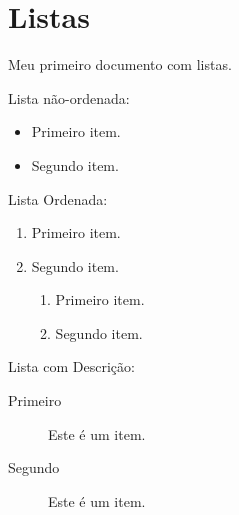 \documentclass{article}
\begin{document}
	\section{Listas}
	Meu primeiro documento com listas.
	
	Lista não-ordenada:
	
	\begin{itemize}
		\item Primeiro item.
		\item Segundo item.
	\end{itemize} 

	Lista Ordenada:
	\begin{enumerate}
		\item Primeiro item.
		\item Segundo item.
			\begin{enumerate}
				\item Primeiro item.
				\item Segundo item.
			\end{enumerate}
	\end{enumerate}

	Lista com Descrição:
	\begin{description}
		\item[Primeiro] Este é um item.
		\item[Segundo] Este é um item.
	\end{description}
	
	
\end{document}
